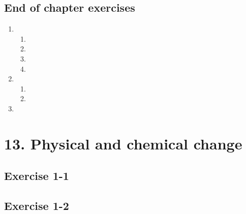 \begin{enumerate}[label=\textbf{\arabic*}., itemsep=5pt]
\subsection{End of chapter exercises} %

\begin{enumerate}[itemsep=6pt, label=\textbf{\arabic*}. ] 
\item %

    \begin{enumerate}[noitemsep, label=\textbf{(\alph*)} ]
  \item %
\item %
\item %
\item %
 \end{enumerate}
\item %

    \begin{enumerate}[noitemsep, label=\textbf{(\alph*)} ]
 \item %
\item %

\end{enumerate}

\item %
\end{enumerate}

\section{13. Physical and chemical change}
\subsection{Exercise 1-1}
\subsection{Exercise 1-2}

\end{enumerate}
